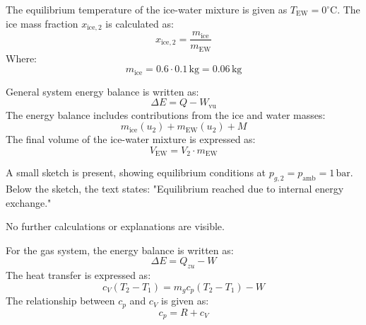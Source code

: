 The equilibrium temperature of the ice-water mixture is given as \( T_{\text{EW}} = 0^\circ\text{C} \). The ice mass fraction \( x_{\text{ice},2} \) is calculated as:  
\[
x_{\text{ice},2} = \frac{m_{\text{ice}}}{m_{\text{EW}}}
\]  
Where:  
\[
m_{\text{ice}} = 0.6 \cdot 0.1 \, \text{kg} = 0.06 \, \text{kg}
\]  

General system energy balance is written as:  
\[
\Delta E = Q - W_{\text{vu}}
\]  
The energy balance includes contributions from the ice and water masses:  
\[
m_{\text{ice}}(u_2) + m_{\text{EW}}(u_2) + M
\]  
The final volume of the ice-water mixture is expressed as:  
\[
V_{\text{EW}} = V_2 \cdot m_{\text{EW}}
\]  

A small sketch is present, showing equilibrium conditions at \( p_{g,2} = p_{\text{amb}} = 1 \, \text{bar} \). Below the sketch, the text states:  
"Equilibrium reached due to internal energy exchange."  

No further calculations or explanations are visible.

For the gas system, the energy balance is written as:  
\[
\Delta E = Q_{zu} - W
\]  
The heat transfer is expressed as:  
\[
c_V(T_2 - T_1) = m_g c_p(T_2 - T_1) - W
\]  
The relationship between \( c_p \) and \( c_V \) is given as:  
\[
c_p = R + c_V
\]